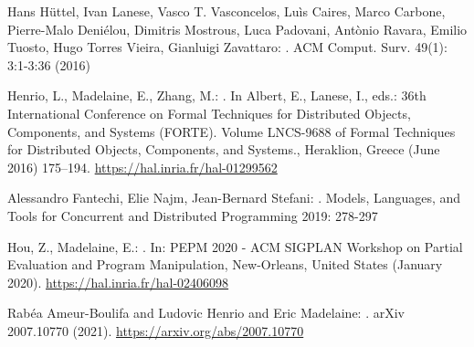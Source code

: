 \documentclass[11pt,fleqn]{article}
\begin{document}
\begin{thebibliography}{9}

Hans H\"uttel, Ivan Lanese, Vasco T. Vasconcelos, Lu\`is Caires, Marco Carbone, Pierre-Malo Deni\'elou, Dimitris Mostrous, Luca Padovani, Ant\`onio Ravara, Emilio Tuosto, Hugo Torres Vieira, Gianluigi Zavattaro:
.
\newblock ACM Comput. Surv. 49(1): 3:1-3:36 (2016)



Henrio, L., Madelaine, E., Zhang, M.:
.
\newblock In Albert, E., Lanese, I., eds.: {36th International Conference on
  Formal Techniques for Distributed Objects, Components, and Systems (FORTE)}.
  Volume LNCS-9688 of Formal Techniques for Distributed Objects, Components,
  and Systems., Heraklion, Greece (June 2016)  175--194. 
\newblock  \url{https://hal.inria.fr/hal-01299562}

Alessandro Fantechi, Elie Najm, Jean-Bernard Stefani:
.
\newblock Models, Languages, and Tools for Concurrent and Distributed Programming 2019: 278-297



Hou, Z., Madelaine, E.:
.
\newblock In: {PEPM 2020 - ACM SIGPLAN Workshop on Partial Evaluation and
  Program Manipulation}, New-Orleans, United States (January 2020). 
 \newblock \url{https://hal.inria.fr/hal-02406098}

Rabéa Ameur-Boulifa and Ludovic Henrio and Eric Madelaine:
.
\newblock arXiv {2007.10770} (2021).
 \newblock \url{https://arxiv.org/abs/2007.10770}
\end{thebibliography}
\end{document}
